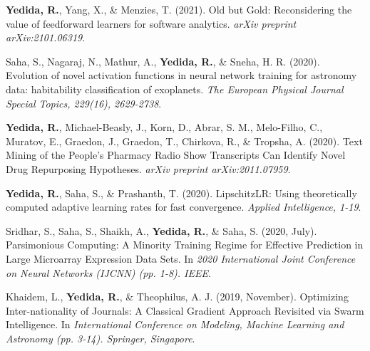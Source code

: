     \item
      {\textbf{Yedida, R.}, Yang, X., \& Menzies, T. (2021). Old but Gold: Reconsidering the value of feedforward learners for software analytics. \textit{arXiv preprint arXiv:2101.06319}.}
    \item
      {Saha, S., Nagaraj, N., Mathur, A., \textbf{Yedida, R.}, \& Sneha, H. R. (2020). Evolution of novel activation functions in neural network training for astronomy data: habitability classification of exoplanets. \textit{The European Physical Journal Special Topics, 229(16), 2629-2738}.}
    \item
      {\textbf{Yedida, R.}, Michael-Beasly, J., Korn, D., Abrar, S. M., Melo-Filho, C., Muratov, E., Graedon, J., Graedon, T., Chirkova, R., \& Tropsha, A. (2020). Text Mining of the People's Pharmacy Radio Show Transcripts Can Identify Novel Drug Repurposing Hypotheses. \textit{arXiv preprint arXiv:2011.07959}.}
    \item
      {\textbf{Yedida, R.}, Saha, S., \& Prashanth, T. (2020). LipschitzLR: Using theoretically computed adaptive learning rates for fast convergence. \textit{Applied Intelligence, 1-19}.}
    \item
      {Sridhar, S., Saha, S., Shaikh, A., \textbf{Yedida, R.}, \& Saha, S. (2020, July). Parsimonious Computing: A Minority Training Regime for Effective Prediction in Large Microarray Expression Data Sets. In \textit{2020 International Joint Conference on Neural Networks (IJCNN) (pp. 1-8). IEEE}.}
    \item
      {Khaidem, L., \textbf{Yedida, R.}, \& Theophilus, A. J. (2019, November). Optimizing Inter-nationality of Journals: A Classical Gradient Approach Revisited via Swarm Intelligence. In \textit{International Conference on Modeling, Machine Learning and Astronomy (pp. 3-14). Springer, Singapore}.}
 \resumeSubHeadingListEnd